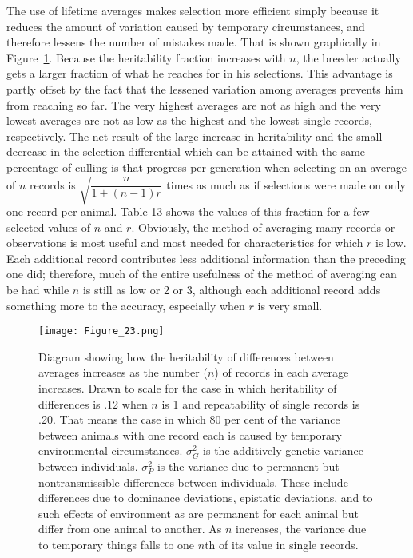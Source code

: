The use of lifetime averages makes selection more efficient simply
because it reduces the amount of variation caused by temporary circumstances,
and therefore lessens the number of mistakes made. That is
shown graphically in Figure~\ref{fig:Lush_Figure_23}. Because the heritability fraction
increases with $n$, the breeder actually gets a larger fraction of what he
reaches for in his selections. This advantage is partly offset by the fact
that the lessened variation among averages prevents him from reaching
so far. The very highest averages are not as high and the very lowest
averages are not as low as the highest and the lowest single records,
respectively. The net result of the large increase in heritability and the
small decrease in the selection differential which can be attained with
the same percentage of culling is that progress per generation when
selecting on an average of $n$ records is \(\sqrt{\dfrac{n}{1 + (n - 1)r}}\)
times as much as if selections were made on only one record per animal. Table
13 shows the values of this fraction for a few selected values of $n$ and $r$.
Obviously, the method of averaging many records or observations is
most useful and most needed for characteristics for which $r$ is low. Each
additional record contributes less additional information than the preceding
one did; therefore, much of the entire usefulness of the method
of averaging can be had while $n$ is still as low or 2 or 3, although each
additional record adds something more to the accuracy, especially when
$r$ is very small.

\begin{figure}[htbp]
	\centering
    \texttt{[image: Figure\_23.png]}
    \caption{Diagram showing how the heritability of differences between averages
increases as the number ($n$) of records in each average increases. Drawn to scale for
the case in which heritability of differences is .12 when $n$ is 1 and repeatability of
single records is .20. That means the case in which 80 per cent of the variance
between animals with one record each is caused by temporary environmental circumstances.
$\sigma_G^2$ is the additively genetic variance between individuals. $\sigma_P^2$ is the variance
due to permanent but nontransmissible differences between individuals. These
include differences due to dominance deviations, epistatic deviations, and to such
effects of environment as are permanent for each animal but differ from one animal
to another. As $n$ increases, the variance due to temporary things falls to one $n$th of its
value in single records.}
    \label{fig:Lush_Figure_23}
\end{figure}

